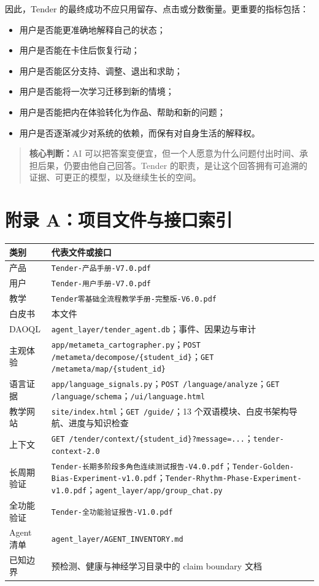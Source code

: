 \documentclass[UTF8,a4paper,11pt]{ctexart}
\newcommand{\keypoint}[1]{\begin{quote}\noindent\textbf{\color{TenderBlue}核心判断：}#1\end{quote}}
\begin{document}
因此，Tender 的最终成功不应只用留存、点击或分数衡量。更重要的指标包括：

\begin{itemize}
\item 用户是否能更准确地解释自己的状态；
\item 用户是否能在卡住后恢复行动；
\item 用户是否能区分支持、调整、退出和求助；
\item 用户是否能将一次学习迁移到新的情境；
\item 用户是否能把内在体验转化为作品、帮助和新的问题；
\item 用户是否逐渐减少对系统的依赖，而保有对自身生活的解释权。
\end{itemize}

\keypoint{AI 可以把答案变便宜，但一个人愿意为什么问题付出时间、承担后果，仍要由他自己回答。Tender 的职责，是让这个回答拥有可追溯的证据、可更正的模型，以及继续生长的空间。}

\newpage
\appendix
\section{附录 A：项目文件与接口索引}

\begin{center}
\begin{longtable}{@{}p{4.2cm}p{8.8cm}@{}}
\toprule
\textbf{类别} & \textbf{代表文件或接口} \\
\midrule
产品 & \texttt{Tender-产品手册-V7.0.pdf} \\
用户 & \texttt{Tender-用户手册-V7.0.pdf} \\
教学 & \texttt{Tender零基础全流程教学手册-完整版-V6.0.pdf} \\
白皮书 & 本文件 \\
DAOQL & \texttt{agent\_layer/tender\_agent.db}；事件、因果边与审计 \\
主观体验 & \texttt{app/metameta\_cartographer.py}；\texttt{POST /metameta/decompose/\{student\_id\}}；\texttt{GET /metameta/map/\{student\_id\}} \\
语言证据 & \texttt{app/language\_signals.py}；\texttt{POST /language/analyze}；\texttt{GET /language/schema}；\texttt{/ui/language.html} \\
教学网站 & \texttt{site/index.html}；\texttt{GET /guide/}；13 个双语模块、白皮书架构导航、进度与知识检查 \\
上下文 & \texttt{GET /tender/context/\{student\_id\}?message=...}；\texttt{tender-context-2.0} \\
长周期验证 & \texttt{Tender-长期多阶段多角色连续测试报告-V4.0.pdf}；\texttt{Tender-Golden-Bias-Experiment-v1.0.pdf}；\texttt{Tender-Rhythm-Phase-Experiment-v1.0.pdf}；\texttt{agent\_layer/app/group\_chat.py} \\
全功能验证 & \texttt{Tender-全功能验证报告-V1.0.pdf} \\
Agent 清单 & \texttt{agent\_layer/AGENT\_INVENTORY.md} \\
已知边界 & 预检测、健康与神经学习目录中的 claim boundary 文档 \\
\bottomrule
\end{longtable}
\end{center}
\end{document}
